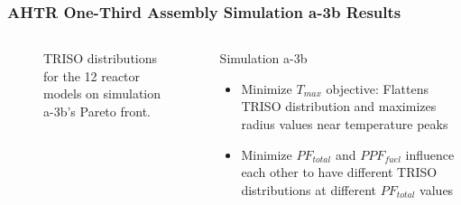 \begin{frame}
    \frametitle{AHTR One-Third Assembly Simulation a-3b Results}
    \begin{columns}
        \begin{column}{0.7\textwidth}
    \begin{figure}
        \caption{TRISO distributions for the 12 reactor models on simulation 
        a-3b's Pareto front.}
    \end{figure}
\end{column}
\begin{column}{0.35\textwidth}
    \begin{block}{Simulation a-3b}
        \begin{itemize}
        \item Minimize $T_{max}$ objective: Flattens TRISO distribution and maximizes radius values 
        near temperature peaks 
        \item Minimize $PF_{total}$ and $PPF_{fuel}$ influence each other to have different 
        TRISO distributions at different $PF_{total}$ values 
        \end{itemize}
        \end{block}
    \end{column}
\end{columns}
\end{frame}

